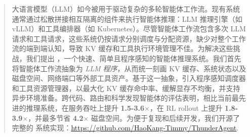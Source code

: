 \begin{abstract}
    大语言模型（LLM）如今被用于驱动复杂的多轮智能体工作流。现有系统通常通过松散拼接相互隔离的组件来执行智能体推理：LLM 推理引擎（如 vLLM）和工具编排器（如 Kubernetes）。尽管智能体工作流包含多次 LLM 请求和工具请求，这些系统仍按请求分别调度与分配资源，缺少对整个工作流的端到端认知，导致 KV 缓存和工具执行环境管理不佳。为解决这些挑战，我们提出 \ouralg，一个快速、简单且程序感知的智能体推理系统。我们首先将智能体工作流抽象为 \textit{LLM 程序}，从而统一刻画 KV 缓存、系统状态以及磁盘空间、网络端口等外部工具资产。基于这一抽象，\ouralg 引入程序感知调度器和工具资源管理器，以最大化 KV 缓存命中率、缓解显存不均衡，并支持异步环境准备。跨代码、路由和科学发现智能体的评估表明，相比当前最先进的推理系统，\ouralg 在服务吞吐上提升 \textbf{1.5-3.6$\times$}，在 RL rollout 上提升 \textbf{1.8-3.9$\times$}，并最多节省 \textbf{4.2$\times$} 磁盘空间。为便于复现和后续开发，我们开源了完整的 \ouralg 系统实现：\url{https://github.com/HaoKang-Timmy/ThunderAgent}.
\end{abstract}

